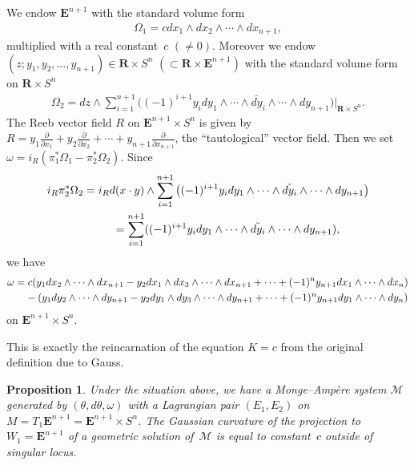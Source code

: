 \documentclass[pdftex]{sigma}
\newtheorem{Prop}[Th]{Proposition}
\begin{document}
We endow ${\mathbf{E}}^{n+1}$
with the standard volume form
\begin{gather*}
\Omega_1 = c dx_1\wedge dx_2 \wedge \cdots \wedge dx_{n+1},
\end{gather*}
multiplied with a real constant~$c$ $(\not= 0)$.
Moreover we endow $(z;y_1,y_2,\dots,y_{n+1}) \in
{\mathbf{R}}\times S^n$ $(\subset {\mathbf{R}} \times {\mathbf{E}}^{n+1})$
with the standard volume form on ${\mathbf{R}}\times S^n$
\begin{gather*}
\Omega_2 = dz \wedge
\sum_{i=1}^{n+1}\big((-1)^{i+1}y_idy_1\wedge \cdots \wedge \breve{dy_i} \wedge
\cdots \wedge dy_{n+1}\big)\vert_{{\mathbf{R}}\times S^n}.
\end{gather*}
The Reeb vector f\/ield $R$ on ${\mathbf{E}}^{n+1}\times S^n$ is
given by $R = y_1\frac{\partial}{\partial x_1} + y_2\frac{\partial}{\partial x_2} +
\cdots + y_{n+1}\frac{\partial}{\partial x_{n+1}}$, the ``tautological'' vector f\/ield.
Then we
set $\omega = i_R (\pi_1^*\Omega_1 - \pi_2^*\Omega_2)$.
Since
\begin{gather*}
i_R \pi_2^*\Omega_2    =
 i_R d(x\cdot y)\wedge
\sum_{i=1}^{n+1}\big((-1)^{i+1}y_idy_1\wedge \cdots \wedge \breve{dy_i} \wedge
\cdots \wedge dy_{n+1}\big)\\
\hphantom{i_R \pi_2^*\Omega_2 }{}
   =
\sum_{i=1}^{n+1}((-1)^{i+1}y_idy_1\wedge \cdots \wedge \breve{dy_i} \wedge
\cdots \wedge dy_{n+1}),
\end{gather*}
we have
\begin{gather*}
\omega
   =
c(y_1dx_2\wedge \cdots \wedge dx_{n+1} - y_2dx_1\wedge dx_3\wedge \cdots
\wedge dx_{n+1} + \cdots + (-1)^ny_{n+1}dx_1\wedge \cdots \wedge dx_n) \\
 \hphantom{\omega=}{} -
(y_1dy_2 \wedge \cdots \wedge dy_{n+1}
- y_2dy_1 \wedge dy_3\wedge \cdots \wedge dy_{n+1} + \cdots +
 (-1)^ny_{n+1}dy_1 \wedge \cdots \wedge dy_n)
\end{gather*}
on ${\mathbf{E}}^{n+1}\times S^n$.

This is exactly the reincarnation of the equation $K = c$
from the original def\/inition due to Gauss.


\begin{Prop}
Under the situation above,
we have a Monge--Amp{\`e}re system
$\mathcal{M}$ generated by $(\theta, d\theta, \omega)$
with a Lagrangian pair $(E_1,E_2)$ on $M=T_1{\mathbf{E}}^{n+1}={\mathbf{E}}^{n+1}\times S^n$.
The Gaussian curvature
of the projection to $W_1={\mathbf{E}}^{n+1}$ of a geometric solution
of~$\mathcal{M}$
is equal to constant~$c$ outside of singular locus.
\end{Prop}
\end{document}
